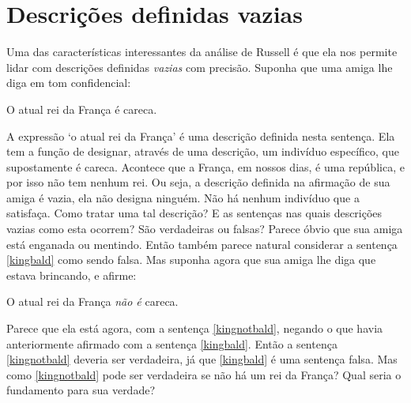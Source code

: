 \section{Descrições definidas vazias}\label{s:Desdefvaz}
Uma das características interessantes da análise de Russell é que ela nos permite lidar com descrições definidas \emph{vazias} com precisão. 
Suponha que uma amiga lhe diga em tom confidencial:
	\begin{earg}
		\item[\ex{kingbald}] O atual rei da França é careca.
	\end{earg}
A expressão `o atual rei da França' é uma descrição definida nesta sentença.
Ela tem a função de designar, através de uma descrição, um indivíduo específico, que supostamente é careca. 
Acontece que a França, em nossos dias, é uma república, e por isso não tem nenhum rei.
Ou seja, a descrição definida na afirmação de sua amiga é vazia, ela não designa ninguém. Não há nenhum indivíduo que a satisfaça.
Como tratar uma tal descrição?
E as sentenças nas quais descrições vazias como esta ocorrem? São verdadeiras ou falsas?
Parece óbvio que sua amiga está enganada ou mentindo.
Então também parece natural considerar a sentença \ref{kingbald} como sendo falsa.
Mas suponha agora que sua amiga lhe diga que estava brincando, e afirme:
	\begin{earg}
		\item[\ex{kingnotbald}] O atual rei da França \emph{não é} careca.
	\end{earg}
Parece que ela está agora, com a sentença \ref{kingnotbald}, negando o que havia anteriormente afirmado com a sentença \ref{kingbald}.
Então a sentença \ref{kingnotbald} deveria ser verdadeira, já que \ref{kingbald} é uma sentença falsa.
Mas como \ref{kingnotbald} pode ser verdadeira se não há um rei da França?
Qual seria o fundamento para sua verdade?

